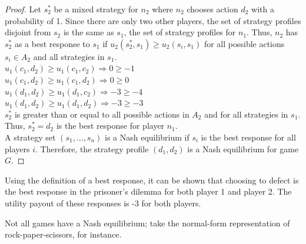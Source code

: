 \begin{proof}
  Let $s^*_2$ be a mixed strategy for $n_2$ where $n_2$ chooses action $d_2$ with a probability of 1. Since there are only two other players, the set of strategy profiles disjoint from $s_2$ is the same as $s_1$, the set of strategy profiles for $n_1$. Thus, $n_2$ has $s^*_2$ as a best response to $s_1$ if $u_2(s^*_2, s_1)\ge u_2(s_i, s_1)$ for all possible actions $s_i\in A_2$ and all strategies in $s_1$.\\
  
  $u_1(c_1, d_2)\ge u_1(c_1, c_2) \Rightarrow 0\ge -1$\\

  $u_1(c_1, d_2)\ge u_1(c_1, d_2) \Rightarrow 0\ge 0$\\

  $u_1(d_1, d_2)\ge u_1(d_1, c_2) \Rightarrow -3\ge -4$\\

  $u_1(d_1, d_2)\ge u_1(d_1, d_2) \Rightarrow -3\ge -3$\\

  $s^*_2$ is greater than or equal to all possible actions in $A_2$ and for all strategies in $s_1$. Thus, $s^*_2=d_2$ is the best response for player $n_1$.\\

  A strategy set $(s_1,\dots ,s_n)$ is a Nash equilibrium if $s_i$ is the best response for all players $i$. Therefore, the strategy profile $(d_1, d_2)$ is a Nash equilibrium for game $G$.
\end{proof}
Using the definition of a best response, it can be shown that choosing to defect is the best response in the prisoner's dilemma for both player 1 and player 2. The utility payout of these responses is -3 for both players.

Not all games have a Nash equilibrium; take the normal-form representation of rock-paper-scissors, for instance.

